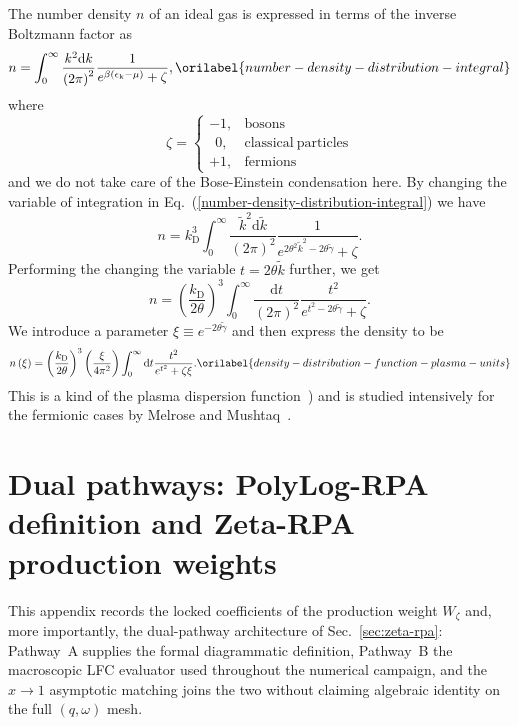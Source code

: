 \documentclass[aps,showkeys,noshowpacs,superscriptaddress,pre,preprint]{revtex4-2}
\let\label\orilabel
\begin{document}
The number density $n$ of an ideal gas is expressed in terms of 
the inverse Boltzmann factor as
\begin{equation}
n = \int_0^\infty \frac{k^2 \mathrm{d}k}{\left( 2\pi \right)^2}
\frac{1}{e^{\beta \left( \epsilon_\mathrm{k} - \mu \right)} + \zeta} ,
\label{number-density-distribution-integral}
\end{equation}
where
\begin{equation}
\zeta = \begin{cases}
-1, & \mathrm{bosons}\\
~~0, & \mathrm{classical~particles}\\
+1, & \mathrm{fermions} 
\end{cases}
\end{equation}
and we do not take care of the Bose-Einstein condensation here.
By changing the variable of integration in Eq.~(\ref{number-density-distribution-integral})
we have
\begin{equation*}
n = k_\mathrm{D}^3 \int_0^\infty \frac{\tilde{k}^2 \mathrm{d}\tilde{k}}{\left( 2\pi \right)^2}
\frac{1}{ e^{2 \theta^2 \tilde{k}^2  - 2 \theta \tilde{\gamma}}  + \zeta} .
\end{equation*}
Performing the changing the variable $t = 2 \theta \tilde{k}$ further,
we get
\begin{equation*}
n = \left( \frac{ k_\mathrm{D} }{ 2 \theta } \right)^3
\int_0^\infty \frac{\mathrm{d}t}{\left( 2\pi \right)^2} 
\frac{t^2}{ e^{t^2  - 2 \theta \tilde{\gamma}}  + \zeta} .
\end{equation*}
We introduce a parameter $\xi \equiv e^{-2 \theta \tilde{\gamma}}$ and
then express the density to be
\begin{equation}
n\left( \xi \right) = \left( \frac{ k_\mathrm{D} }{ 2 \theta } \right)^3
\left( \frac{\xi}{4\pi^2} \right)
\int_0^\infty \mathrm{d}t \frac{t^2}{ e^{t^2}  + \zeta \xi} .
\label{density-distribution-function-plasma-units}
\end{equation}
This is a kind of the plasma dispersion function~\cite{Fried-Conte1961})
and is studied intensively for the fermionic cases by Melrose and Mushtaq~\cite{Melrose-Mushtaq2010}.

\section{Dual pathways: PolyLog-RPA definition and Zeta-RPA production weights}
\label{sec:zeta-weight-coefficients}

This appendix records the locked coefficients of the production weight $W_\zeta$ and, more importantly, the dual-pathway architecture of Sec.~\ref{sec:zeta-rpa}: Pathway~A supplies the formal diagrammatic definition, Pathway~B the macroscopic LFC evaluator used throughout the numerical campaign, and the $x\to 1$ asymptotic matching joins the two without claiming algebraic identity on the full $(q,\omega)$ mesh.
\end{document}
